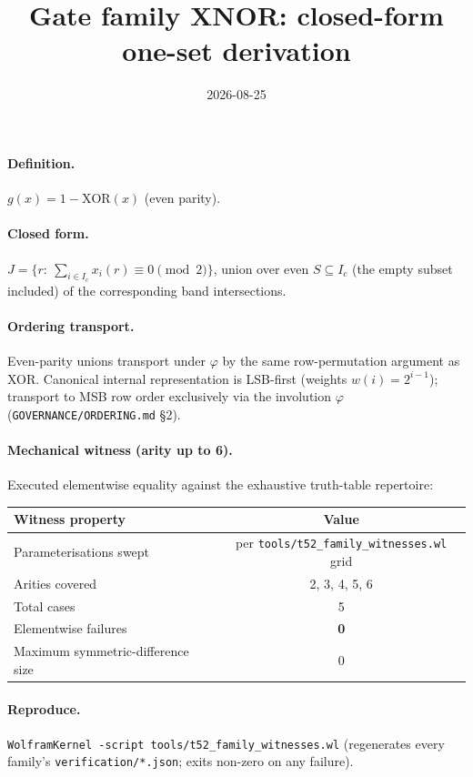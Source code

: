 \documentclass{article}
\title{Gate family XNOR: closed-form one-set derivation}
\date{2026-08-25}
\begin{document}
\maketitle

\paragraph{Definition.} $g(x)=1-\mathrm{XOR}(x)$ (even parity).

\paragraph{Closed form.} $J=\{r:\ \sum_{i\in I_c}x_i(r)\equiv 0\pmod 2\}$, union over even $S\subseteq I_c$ (the empty subset included) of the corresponding band intersections.

\paragraph{Ordering transport.} Even-parity unions transport under $\varphi$ by the same row-permutation argument as XOR.
Canonical internal representation is LSB-first (weights $w(i)=2^{i-1}$);
transport to MSB row order exclusively via the involution $\varphi$
(\texttt{GOVERNANCE/ORDERING.md} \S2).

\paragraph{Mechanical witness (arity up to 6).} Executed elementwise equality
against the exhaustive truth-table repertoire:
\begin{center}
\begin{tabular}{lc}
\hline
Witness property & Value \\ \hline
Parameterisations swept & per \texttt{tools/t52_family_witnesses.wl} grid \\
Arities covered & 2, 3, 4, 5, 6 \\
Total cases & 5 \\
Elementwise failures & \textbf{0} \\
Maximum symmetric-difference size & 0 \\ \hline
\end{tabular}
\end{center}

\paragraph{Reproduce.} \texttt{WolframKernel -script tools/t52_family_witnesses.wl}
(regenerates every family's \texttt{verification/*.json}; exits non-zero on any failure).
\end{document}
